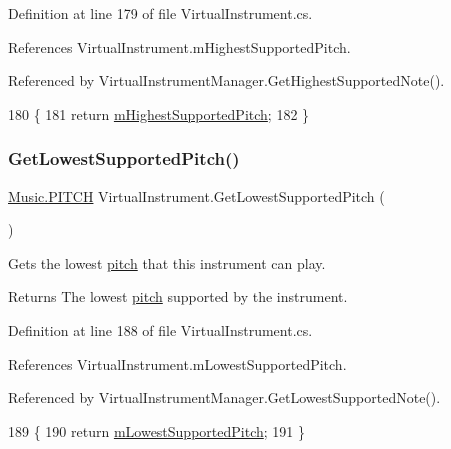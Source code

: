Definition at line 179 of file Virtual\+Instrument.\+cs.



References Virtual\+Instrument.\+m\+Highest\+Supported\+Pitch.



Referenced by Virtual\+Instrument\+Manager.\+Get\+Highest\+Supported\+Note().


\begin{DoxyCode}
180     \{
181         \textcolor{keywordflow}{return} \hyperlink{group___v_i_base_pro_var_ga61fb2c33b53a0f663047779d7ceb18f3}{mHighestSupportedPitch};
182     \}
\end{DoxyCode}
\mbox{\label{group___v_i_base_pub_func_gac42b3915bbfec60b83650abd701d0690}} 
\subsubsection{\texorpdfstring{Get\+Lowest\+Supported\+Pitch()}{GetLowestSupportedPitch()}}
{\footnotesize\ttfamily \hyperlink{group___music_enums_ga508f69b199ea518f935486c990edac1d}{Music.\+P\+I\+T\+CH} Virtual\+Instrument.\+Get\+Lowest\+Supported\+Pitch (\begin{DoxyParamCaption}{ }\end{DoxyParamCaption})}



Gets the lowest \hyperlink{group___music_enums_ga508f69b199ea518f935486c990edac1d}{pitch} that this instrument can play. 

\begin{DoxyReturn}{Returns}
The lowest \hyperlink{group___music_enums_ga508f69b199ea518f935486c990edac1d}{pitch} supported by the instrument. 
\end{DoxyReturn}


Definition at line 188 of file Virtual\+Instrument.\+cs.



References Virtual\+Instrument.\+m\+Lowest\+Supported\+Pitch.



Referenced by Virtual\+Instrument\+Manager.\+Get\+Lowest\+Supported\+Note().


\begin{DoxyCode}
189     \{
190         \textcolor{keywordflow}{return} \hyperlink{group___v_i_base_pro_var_ga3cae52b1bcc0178a8a6b03c7aaf7aac8}{mLowestSupportedPitch};
191     \}
\end{DoxyCode}
\mbox{\label{group___v_i_base_pub_func_ga6ce5a7b3406269ea433be721d7d11177}} 
